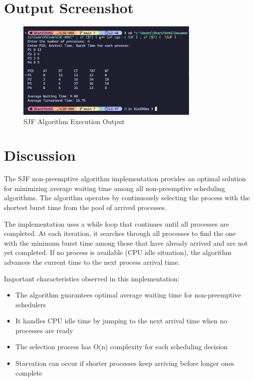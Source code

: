 \documentclass[12pt,a4paper]{article}
\begin{document}
\section{Output Screenshot}
\begin{figure}[H]
    \centering
    \includegraphics[width=0.8\textwidth]{Screenshot 2025-07-23 134801.png}
    \caption{SJF Algorithm Execution Output}
    \label{fig:sjf_output}
\end{figure}

\section{Discussion}
The SJF non-preemptive algorithm implementation provides an optimal solution for minimizing average waiting time among all non-preemptive scheduling algorithms. The algorithm operates by continuously selecting the process with the shortest burst time from the pool of arrived processes.

The implementation uses a while loop that continues until all processes are completed. At each iteration, it searches through all processes to find the one with the minimum burst time among those that have already arrived and are not yet completed. If no process is available (CPU idle situation), the algorithm advances the current time to the next process arrival time.

Important characteristics observed in this implementation:
\begin{itemize}
    \item The algorithm guarantees optimal average waiting time for non-preemptive schedulers
    \item It handles CPU idle time by jumping to the next arrival time when no processes are ready
    \item The selection process has O(n) complexity for each scheduling decision
    \item Starvation can occur if shorter processes keep arriving before longer ones complete
\end{itemize}
\end{document}

